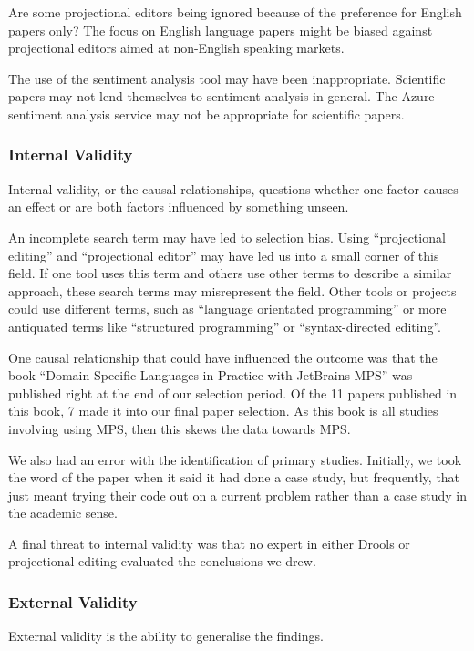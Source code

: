Are some projectional editors being ignored because of the preference for English papers only?
The focus on English language papers might be biased against projectional editors aimed at non-English speaking markets.

The use of the sentiment analysis tool may have been inappropriate.
Scientific papers may not lend themselves to sentiment analysis in general.
The Azure sentiment analysis service may not be appropriate for scientific papers.

\subsubsection{Internal Validity}
Internal validity, or the causal relationships, questions whether one factor causes an effect or are both factors influenced by something unseen.

An incomplete search term may have led to selection bias.  
Using ``projectional editing'' and ``projectional editor'' may have led us into a small corner of this field.
If one tool uses this term and others use other terms to describe a similar approach, these search terms may misrepresent the field.
Other tools or projects could use different terms, such as ``language orientated programming'' or more antiquated terms like ``structured programming'' or ``syntax-directed editing''.

One causal relationship that could have influenced the outcome was that the book ``Domain-Specific Languages in Practice with JetBrains MPS'' was published right at the end of our selection period.
Of the 11 papers published in this book, 7 made it into our final paper selection.
As this book is all studies involving using MPS, then this skews the data towards MPS.

We also had an error with the identification of primary studies. 
Initially, we took the word of the paper when it said it had done a case study, but frequently, that just meant trying their code out on a current problem rather than a case study in the academic sense.

A final threat to internal validity was that no expert in either Drools or projectional editing evaluated the conclusions we drew.

\subsubsection{External Validity}
External validity is the ability to generalise the findings.

